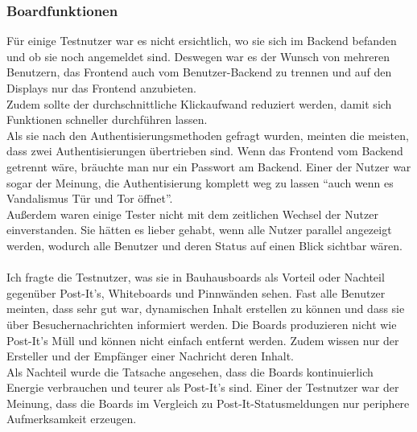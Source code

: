 \subsubsection{Boardfunktionen}\label{Boardfunktionen}
Für einige Testnutzer war es nicht ersichtlich, wo sie sich im Backend befanden und ob sie noch angemeldet sind.
Deswegen war es der Wunsch von mehreren Benutzern, das Frontend auch vom Benutzer-Backend zu trennen und auf den Displays nur das Frontend anzubieten.
\\
Zudem sollte der durchschnittliche Klickaufwand reduziert werden, damit sich Funktionen schneller durchführen lassen.
\\
Als sie nach den Authentisierungsmethoden gefragt wurden, meinten die meisten, dass zwei Authentisierungen übertrieben sind.
Wenn das Frontend vom Backend getrennt wäre, bräuchte man nur ein Passwort am Backend.
Einer der Nutzer war sogar der Meinung, die Authentisierung komplett weg zu lassen ``auch wenn es Vandalismus Tür und Tor öffnet''.
\\
Außerdem waren einige Tester nicht mit dem zeitlichen Wechsel der Nutzer einverstanden.
Sie hätten es lieber gehabt, wenn alle Nutzer parallel angezeigt werden, wodurch alle Benutzer und deren Status auf einen Blick sichtbar wären.
\\
\\
Ich fragte die Testnutzer, was sie in Bauhausboards als Vorteil oder Nachteil gegenüber Post-It's, Whiteboards und Pinnwänden sehen.
Fast alle Benutzer meinten, dass sehr gut war, dynamischen Inhalt erstellen zu können und dass sie über Besuchernachrichten informiert werden.
Die Boards produzieren nicht wie Post-It's Müll und können nicht einfach entfernt werden.
Zudem wissen nur der Ersteller und der Empfänger einer Nachricht deren Inhalt.
\\
Als Nachteil wurde die Tatsache angesehen, dass die Boards kontinuierlich Energie verbrauchen und teurer als Post-It's sind.
Einer der Testnutzer war der Meinung, dass die Boards im Vergleich zu Post-It-Statusmeldungen nur periphere Aufmerksamkeit erzeugen.


